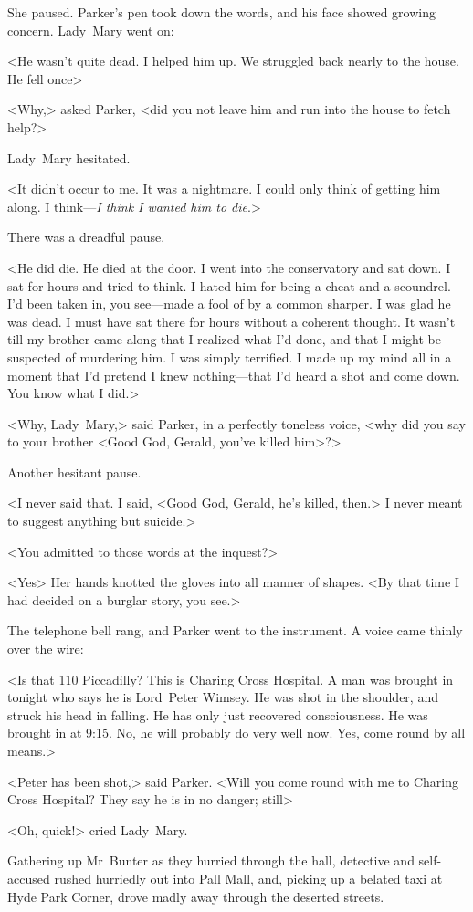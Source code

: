 She paused. Parker's pen took down the words, and his face showed growing concern. Lady~Mary went on:

<He wasn't quite dead. I helped him up. We struggled back nearly to the house. He fell once\longdash>

<Why,> asked Parker, <did you not leave him and run into the house to fetch help?>

Lady~Mary hesitated.

<It didn't occur to me. It was a nightmare. I could only think of getting him along. I think—\emph{I think I wanted him to die}.>

There was a dreadful pause.

<He did die. He died at the door. I went into the conservatory and sat down. I sat for hours and tried to think. I hated him for being a cheat and a scoundrel. I'd been taken in, you see—made a fool of by a common sharper. I was glad he was dead. I must have sat there for hours without a coherent thought. It wasn't till my brother came along that I realized what I'd done, and that I might be suspected of murdering him. I was simply terrified. I made up my mind all in a moment that I'd pretend I knew nothing—that I'd heard a shot and come down. You know what I did.>

<Why, Lady~Mary,> said Parker, in a perfectly toneless voice, <why did you say to your brother <Good God, Gerald, you've killed him>?>

Another hesitant pause.

<I never said that. I said, <Good God, Gerald, he's killed, then.> I never meant to suggest anything but suicide.>

<You admitted to those words at the inquest?>

<Yes\longdash> Her hands knotted the gloves into all manner of shapes. <By that time I had decided on a burglar story, you see.>

The telephone bell rang, and Parker went to the instrument. A voice came thinly over the wire:

<Is that 110 Piccadilly? This is Charing Cross Hospital. A man was brought in tonight who says he is Lord~Peter Wimsey. He was shot in the shoulder, and struck his head in falling. He has only just recovered consciousness. He was brought in at 9:15. No, he will probably do very well now. Yes, come round by all means.>

<Peter has been shot,> said Parker. <Will you come round with me to Charing Cross Hospital? They say he is in no danger; still\longdash>

<Oh, quick!> cried Lady~Mary.

Gathering up Mr~Bunter as they hurried through the hall, detective and self-accused rushed hurriedly out into Pall Mall, and, picking up a belated taxi at Hyde Park Corner, drove madly away through the deserted streets.

